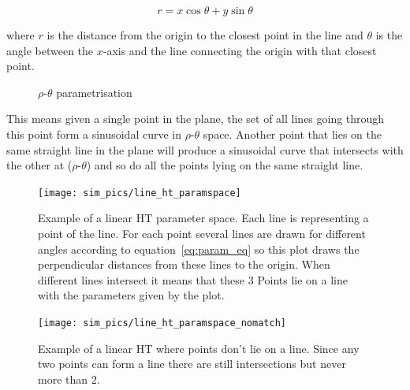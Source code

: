 \documentclass[11pt,twoside]{scrreprt}
\begin{document}
\begin{equation}
  r = x\cos\theta + y\sin\theta\label{eq:param_eq}
\end{equation}

where $r$ is the distance from the origin to the closest point in the line and $\theta$ is the angle between the $x$-axis and the line connecting the origin with that closest point.

\begin{figure}[ht]
  \centering
  \caption{$\rho\text{-}\theta$ parametrisation}
  \label{fig:rhotheta}
\end{figure}

This means given a single point in the plane, the set of all lines going through this point form a sinusoidal curve in $\rho\text{-}\theta$ space. Another point 
that lies on the same straight line in the plane will produce a sinusoidal curve that intersects with the other at ($\rho\text{-}\theta$) and so do all the points lying on the same straight line. 


\begin{figure}[tb]
  \centering
  \texttt{[image: sim\_pics/line\_ht\_paramspace]}
  \caption[Example of a linear HT space]{Example of a linear HT parameter space. Each line is representing a point of the line. For each point several lines are drawn for different angles according to equation~\ref{eq:param_eq} so this plot draws the perpendicular distances from these lines to the origin. When different lines intersect it means that these 3 Points lie on a line with the parameters given by the plot.}
  \label{fig:line_ht}
\end{figure}

\begin{figure}[tb]
  \centering
  \texttt{[image: sim\_pics/line\_ht\_paramspace\_nomatch]}
  \caption[Example of a linear HT where points don't lie on a line]{Example of a linear HT where points don't lie on a line. Since any two points can form a line there are still intersections but never more than 2.}
  \label{fig:line_ht_nomatch}
\end{figure}
\end{document}
